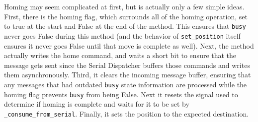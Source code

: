 Homing may seem complicated at first, but is actually only a few simple ideas.
First, there is the homing flag, which surrounds all of the homing operation, set to true at the start and False at the end of the method.
This ensures that \texttt{busy} never goes False during this method (and the behavior of \texttt{set\_position} itself ensures it never goes False until that move is complete as well).
Next, the method actually writes the home command, and waits a short bit to ensure that the message gets sent since the Serial Dispatcher buffers those commands and writes them asynchronously.
Third, it clears the incoming message buffer, ensuring that any messages that had outdated \texttt{busy} state information are processed while the homing flag prevents \texttt{busy} from being False.
Next it resets the signal used to determine if homing is complete and waits for it to be set by \texttt{\_consume\_from\_serial}.
Finally, it sets the position to the expected destination.

\clearpage
